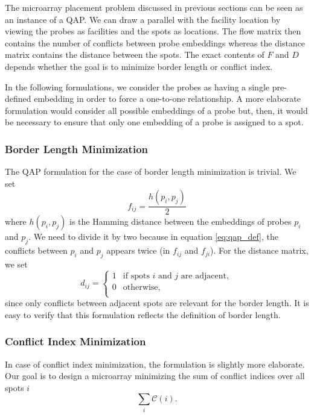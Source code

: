 \documentclass{bioinfo}
\begin{document}
The microarray placement problem discussed in previous sections can be seen as an instance of a QAP. We can draw a parallel with the facility location by viewing the probes as facilities and the spots as locations. The flow matrix then contains the number of conflicts between probe embeddings whereas the distance matrix contains the distance between the spots. The exact contents of $F$ and $D$ depends whether the goal is to minimize border length or conflict index.

In the following formulations, we consider the probes as having a single pre-defined embedding in order to force a one-to-one relationship. A more elaborate formulation would consider all possible embeddings of a probe but, then, it would be necessary to ensure that only one embedding of a probe is assigned to a spot.

\subsubsection{Border Length Minimization}

The QAP formulation for the case of border length minimization is trivial. We set
\begin{equation}
f_{ij} = \frac{h(p_i, p_j)}{2}
\end{equation}
where $h(p_i, p_j)$ is the Hamming distance between the embeddings of probes $p_i$ and $p_j$. We need to divide it by two because in equation \ref{eq:qap_def}, the conflicts between $p_i$ and $p_j$ appears twice (in $f_{ij}$ and $f_{ji}$). For the distance matrix, we set
\begin{equation}
d_{ij} =
	\left\{
		\begin{array}{ll}
			1 & \mbox{if spots $i$ and $j$ are adjacent}, \\
			0 & \mbox{otherwise}, \\
		\end{array}
	\right.
\end{equation}
since only conflicts between adjacent spots are relevant for the border length. It is easy to verify that this formulation reflects the definition of border length.

\subsubsection{Conflict Index Minimization}

In case of conflict index minimization, the formulation is slightly more elaborate. Our goal is to design a microarray minimizing the sum of conflict indices over all spots $i$
\begin{equation}
\label{eq:ci_min}
\sum_{i} \mathcal{C}(i).
\end{equation}
\end{document}
